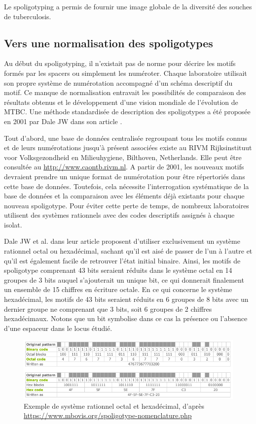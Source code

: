 \documentclass[twoside,a4paper,11pt,frenchb,openany]{report}
\begin{document}
Le spoligotyping a permis de fournir une image globale de la diversité des souches de tuberculosis.


\subsection{Vers une normalisation des spoligotypes}

Au début du spoligotyping, il n'existait pas de norme pour décrire les motifs formés par les spacers ou simplement les numéroter. Chaque laboratoire utilisait son propre système de numérotation accompagné d'un schéma descriptif du motif. Ce manque de normalisation entravait les possibilités de comparaison des résultats obtenus et le développement d'une vision mondiale de l'évolution de MTBC. Une méthode standardisée de description des spoligotypes a été proposée en 2001 par Dale JW dans son article \cite{dale}. 

Tout d'abord, une base de données centralisée regroupant tous les motifs connus et de leurs numérotations jusqu'à présent associées existe au RIVM Rijksinstituut voor Volksgezondheid en Milieuhygiene, Bilthoven, Netherlands. Elle peut être consultée au \url{http://www.caontb.rivm.nl}. A partir de 2001, les nouveaux motifs devraient prendre un unique format de numérotation pour être répertoriés dans cette base de données. Toutefois, cela nécessite l'interrogation systématique de la base de données et la comparaison avec les éléments déjà existants pour chaque nouveau spoligotype. Pour éviter cette perte de temps, de nombreux laboratoires utilisent des systèmes rationnels avec des codes descriptifs assignés à chaque isolat. 

Dale JW et al. dans leur article \cite{dale} proposent d'utiliser exclusivement un système rationnel octal ou hexadécimal, sachant qu'il est aisé de passer de l'un à l'autre et qu'il est également facile de retrouver l'état initial binaire. Ainsi, les motifs de spoligotype comprenant 43 bits seraient réduits dans le système octal en 14 groupes de 3 bits auquel s'ajouterait un unique bit, ce qui donnerait finalement un ensemble de 15 chiffres en écriture octale. En ce qui concerne le système hexadécimal, les motifs de 43 bits seraient réduits en 6 groupes de 8 bits avec un dernier groupe ne comprenant que 3 bits, soit 6 groupes de 2 chiffres hexadécimaux. Notons que un bit symbolise dans ce cas la présence ou l'absence d'une espaceur dans le locus étudié.

\begin{figure}[h!]
\includegraphics[scale=0.6]{hexa.png}
\caption{Exemple de système rationnel octal et hexadécimal, d'après\\ \url{https://www.mbovis.org/spoligotype-nomenclature.php}}
\end{figure}
\end{document}
